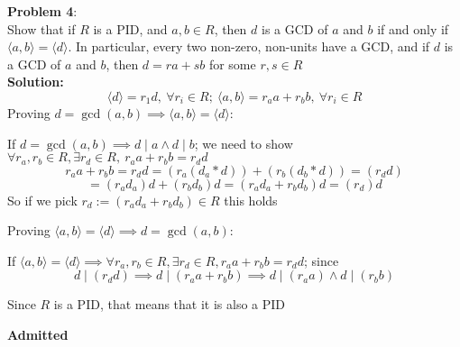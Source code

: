 \documentclass[11pt]{article}
\newcommand{\prob}[3]{\begin{flushleft}
        \textbf{Problem #1}: \\
        #2 
		\textbf{Solution:} 
		#3

\end{flushleft}}
\newcommand{\admit}{
  \begin{flushright}
    \textbf{Admitted}
  \end{flushright}
}
\begin{document}
\prob{4}{
  Show that if $R$ is a PID, and $a, b \in R$, then $d$ is a GCD of $a$ and $b$ if and only if $\langle a, b \rangle = \langle d \rangle$.
  In particular, every two non-zero, non-units have a GCD, and if $d$ is a GCD of $a$ and $b$, then $d = ra + sb$ for some $r, s \in R$ \\
}{ \\
  $$\langle d \rangle = r_1 d,\ \forall r_i \in R;\
    \langle a, b \rangle = r_a a + r_b b,\ \forall r_i \in R$$
  Proving $d = \gcd(a,b) \implies \langle a, b \rangle = \langle d \rangle$:

  If $d = \gcd(a,b) \implies d \mid a \land d \mid b$;
  we need to show $\forall r_a, r_b \in R,\exists r_d \in R,\ r_a a + r_b b = r_d d$
  $$r_a a + r_b b = r_d d = (r_a (d_a * d)) + (r_b (d_b * d)) = (r_d d)$$
  $$= (r_a d_a) d + (r_b d_b) d = (r_a d_a + r_b d_b) d = (r_d) d$$
  So if we pick $r_d := (r_a d_a + r_b d_b) \in R$ this holds

  Proving $\langle a, b \rangle = \langle d \rangle \implies d = \gcd(a,b) $:

  If $\langle a, b \rangle = \langle d \rangle \implies \forall r_a, r_b \in R, \exists r_d \in R, r_a a + r_b b = r_d d$; since
  $$d \mid (r_d d) \implies d \mid (r_a a + r_b b) \implies d \mid (r_a a) \land d \mid (r_b b)$$

  Since $R$ is a PID, that means that it is also a PID
  \admit
}
\end{document}
